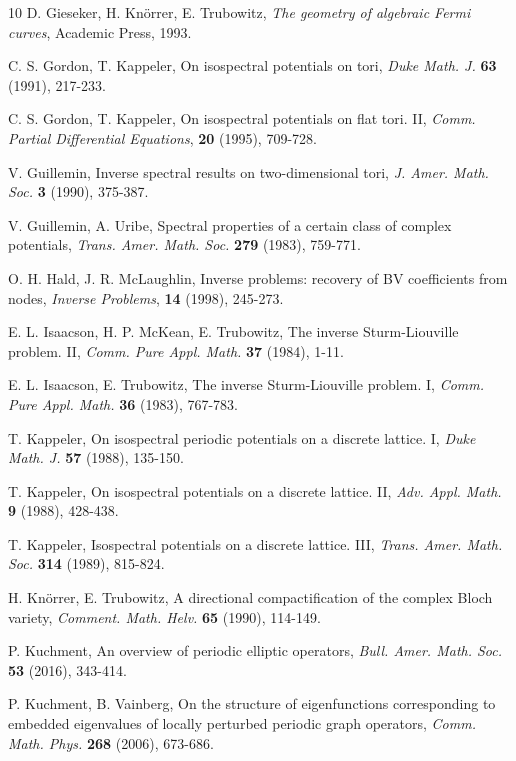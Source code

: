 \documentclass[12pt,letterpaper]{amsart}
\begin{document}
\begin{thebibliography}{10}
 D. Gieseker, H. Kn\"{o}rrer, E. Trubowitz,
\emph{The geometry of algebraic Fermi curves}, Academic Press, 1993.

 C. S. Gordon, T. Kappeler, On isospectral potentials on tori,
\emph{Duke Math. J.} \textbf{63} (1991), 217-233.

 C. S. Gordon, T. Kappeler, On isospectral potentials on flat tori. II,
\emph{Comm. Partial Differential Equations}, \textbf{20} (1995), 709-728.

 V. Guillemin, Inverse spectral results on two-dimensional tori,
\emph{J. Amer. Math. Soc.} \textbf{3} (1990), 375-387.

 V. Guillemin, A. Uribe,
Spectral properties of a certain class of complex potentials,
\emph{Trans. Amer. Math. Soc.} \textbf{279} (1983), 759-771.

 O. H. Hald, J. R. McLaughlin, Inverse problems: recovery of BV coefficients from nodes,
\emph{Inverse Problems}, \textbf{14} (1998), 245-273.


 E. L. Isaacson, H. P. McKean, E. Trubowitz, The inverse Sturm-Liouville problem. II,
\emph{Comm. Pure Appl. Math.} \textbf{37} (1984), 1-11.

 E. L. Isaacson, E. Trubowitz, The inverse Sturm-Liouville problem. I,
\emph{Comm. Pure Appl. Math.} \textbf{36} (1983), 767-783.


 T. Kappeler,
On isospectral periodic potentials on a discrete lattice. I,
\emph{Duke Math. J.} \textbf{57} (1988), 135-150.

 T. Kappeler,
On isospectral potentials on a discrete lattice. II,
\emph{Adv. Appl. Math.} \textbf{9} (1988), 428-438.

 T. Kappeler,
Isospectral potentials on a discrete lattice. III,
\emph{Trans. Amer. Math. Soc.} \textbf{314} (1989), 815-824.

 H. Kn\"{o}rrer, E. Trubowitz,
A directional compactification of the complex Bloch variety,
\emph{Comment. Math. Helv.} \textbf{65} (1990), 114-149.

 P. Kuchment,
An overview of periodic elliptic operators,
\emph{Bull. Amer. Math. Soc.} \textbf{53} (2016), 343-414.


 P. Kuchment, B. Vainberg,
On the structure of eigenfunctions corresponding to embedded eigenvalues of locally perturbed periodic graph operators,
\emph{Comm. Math. Phys.} \textbf{268} (2006), 673-686.



\end{thebibliography}
\end{document}
